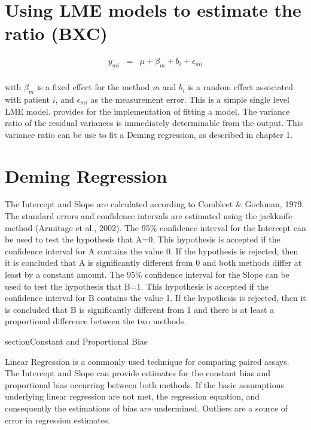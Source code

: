 \documentclass[12pt, a4paper]{report}
\theoremstyle{plain}
\theoremstyle{definition}
\theoremstyle{remark}
\begin{document}
\section{Using LME models to estimate the ratio (BXC) }

\begin{eqnarray*}
	y_{mi} &=& \mu + \beta_{m} + b_{i} + \epsilon_{mi}\\
\end{eqnarray*}

with $\beta_{m}$ is a fixed effect for the method $m$ and $b_{i}$ is a random effect associated with patient $i$, and
$\epsilon_{mi}$ as the measurement error. This is a simple single level LME model. \citet{pb} provides for the implementation of fitting a model. The variance ratio of the residual variances is immediately determinable from the output. This variance ratio can be use to fit a Deming regression, as described in chapter 1.



\section{Deming Regression}
The Intercept and Slope are calculated according to Combleet \& Gochman, 1979. The standard errors and confidence intervals are estimated using the jackknife method (Armitage et al., 2002).
The 95\% confidence interval for the Intercept can be used to test the hypothesis that A=0. This hypothesis is accepted if the confidence interval for A contains the value 0. If the hypothesis is rejected, then it is concluded that A is significantly different from 0 and both methods differ at least by a constant amount.
The 95\% confidence interval for the Slope can be used to test the hypothesis that B=1. This hypothesis is accepted if the confidence interval for B contains the value 1. If the hypothesis is rejected, then it is concluded that B is significantly different from 1 and there is at least a proportional difference between the two methods.

section{Constant and Proportional Bias}

Linear Regression is a commonly used technique for comparing paired assays. The Intercept and Slope can provide estimates for the constant bias and proportional bias occurring between both methods. If the basic assumptions underlying linear regression are not met, the regression equation, and consequently the estimations
of bias are undermined. Outliers are a source of error in regression estimates.
\end{document}
